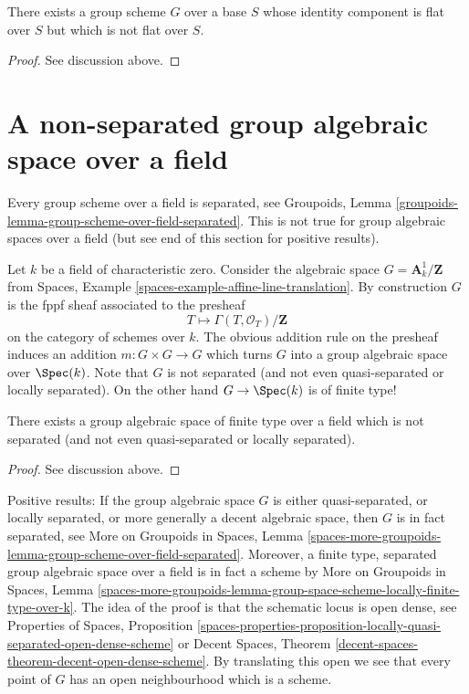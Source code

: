 \begin{lemma}
\label{lemma-non-flat-group-scheme}
There exists a group scheme $G$ over a base $S$ whose identity
component is flat over $S$ but which is not flat over $S$.
\end{lemma}

\begin{proof}
See discussion above.
\end{proof}




\section{A non-separated group algebraic space over a field}
\label{section-non-separated-group-space}

\noindent
Every group scheme over a field is separated, see
Groupoids, Lemma \ref{groupoids-lemma-group-scheme-over-field-separated}.
This is not true for group algebraic spaces over a field
(but see end of this section for positive results).

\medskip\noindent
Let $k$ be a field of characteristic zero.
Consider the algebraic space $G = \mathbf{A}^1_k/\mathbf{Z}$ from
Spaces, Example \ref{spaces-example-affine-line-translation}.
By construction $G$ is the fppf sheaf associated to the presheaf
$$
T \longmapsto \Gamma(T, \mathcal{O}_T) / \mathbf{Z}
$$
on the category of schemes over $k$. The obvious addition rule on the presheaf
induces an addition $m : G \times G \to G$ which turns $G$ into a group
algebraic space over $\Spec(k)$. Note that $G$ is not separated
(and not even quasi-separated or locally separated). On the other hand
$G \to \Spec(k)$ is of finite type!

\begin{lemma}
\label{lemma-non-separated-group-space}
There exists a group algebraic space of finite type over a field
which is not separated (and not even quasi-separated or locally separated).
\end{lemma}

\begin{proof}
See discussion above.
\end{proof}

\noindent
Positive results: If the group algebraic space $G$ is either
quasi-separated, or locally separated, or more generally a
decent algebraic space, then $G$ is in fact separated, see
More on Groupoids in Spaces, Lemma
\ref{spaces-more-groupoids-lemma-group-scheme-over-field-separated}.
Moreover, a finite type, separated group algebraic space over a
field is in fact a scheme by More on Groupoids in Spaces, Lemma
\ref{spaces-more-groupoids-lemma-group-space-scheme-locally-finite-type-over-k}.
The idea of the proof is that the schematic locus is open dense, see
Properties of Spaces, Proposition
\ref{spaces-properties-proposition-locally-quasi-separated-open-dense-scheme}
or
Decent Spaces, Theorem \ref{decent-spaces-theorem-decent-open-dense-scheme}.
By translating this open we see that
every point of $G$ has an open neighbourhood which is a scheme.




